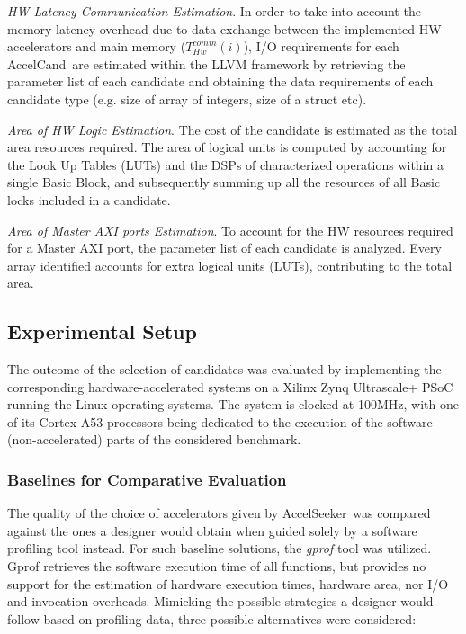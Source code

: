 \documentclass[]{usiinfthesis}
\newcommand{\aseeker}{{AccelSeeker}}
\newcommand{\candidate}{{AccelCand}}
\begin{document}
\emph{HW Latency Communication Estimation}. In order to take into
account the memory latency overhead due to data exchange between the
implemented HW accelerators and main memory ($T_{Hw}^{comm}(i)$), 
I/O requirements for each \candidate\ are
estimated within the LLVM framework by retrieving the parameter list
of each candidate and obtaining the data requirements of
each candidate type (e.g. size of array of integers, size of a struct etc).\par

\emph{Area of HW Logic Estimation}. The cost of the candidate is
estimated as the total area resources required. The area of logical units is 
computed by accounting for the Look Up Tables
(LUTs) and the DSPs of characterized operations within a single Basic
Block, and subsequently summing up all the resources of all Basic
locks included in a candidate.\par

\emph{Area of Master AXI ports Estimation}. To account for the HW
resources required for a Master AXI port, the parameter list of each
candidate is analyzed. Every array identified accounts for extra
logical units (LUTs), contributing to the total area.



\subsection{Experimental Setup}
\label{sec:setup_as}


The outcome of the selection of candidates was evaluated by implementing the 
corresponding hardware-accelerated systems on a Xilinx Zynq Ultrascale+ PSoC running the
Linux operating systems. The system is clocked at 100MHz, with one of
its Cortex A53 processors being dedicated to the execution of the
software (non-accelerated) parts of the considered benchmark.



%
%
%
\subsubsection{Baselines for Comparative Evaluation} 
The quality of the choice of accelerators given by \aseeker\ was compared against 
the ones a designer would obtain when guided solely by a software profiling tool
instead. For such baseline solutions, the \emph{gprof} tool \cite{GrahamJun82} 
was utilized. Gprof retrieves the software execution time of all
functions, but provides no support for the estimation of hardware
execution times, hardware area, nor I/O and invocation
overheads. Mimicking the possible strategies a designer would follow
based on profiling data, three possible alternatives were considered:
\end{document}
